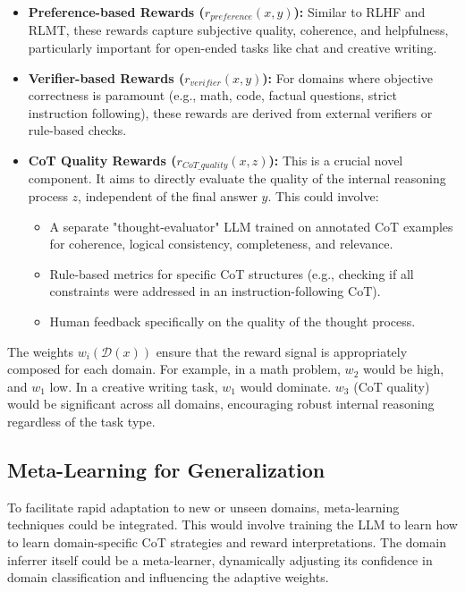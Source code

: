 \documentclass{article}
\begin{document}
\begin{itemize}
    \item \textbf{Preference-based Rewards ($r_{preference}(x, y)$):} Similar to RLHF and RLMT, these rewards capture subjective quality, coherence, and helpfulness, particularly important for open-ended tasks like chat and creative writing.
    \item \textbf{Verifier-based Rewards ($r_{verifier}(x, y)$):} For domains where objective correctness is paramount (e.g., math, code, factual questions, strict instruction following), these rewards are derived from external verifiers or rule-based checks.
    \item \textbf{CoT Quality Rewards ($r_{CoT\_quality}(x, z)$):} This is a crucial novel component. It aims to directly evaluate the quality of the internal reasoning process $z$, independent of the final answer $y$. This could involve:
    \begin{itemize}
        \item A separate "thought-evaluator" LLM trained on annotated CoT examples for coherence, logical consistency, completeness, and relevance.
        \item Rule-based metrics for specific CoT structures (e.g., checking if all constraints were addressed in an instruction-following CoT).
        \item Human feedback specifically on the quality of the thought process.
    \end{itemize}
\end{itemize}
The weights $w_i(\mathcal{D}(x))$ ensure that the reward signal is appropriately composed for each domain. For example, in a math problem, $w_2$ would be high, and $w_1$ low. In a creative writing task, $w_1$ would dominate. $w_3$ (CoT quality) would be significant across all domains, encouraging robust internal reasoning regardless of the task type.

\subsection{Meta-Learning for Generalization}
To facilitate rapid adaptation to new or unseen domains, meta-learning techniques could be integrated. This would involve training the LLM to learn how to learn domain-specific CoT strategies and reward interpretations. The domain inferrer itself could be a meta-learner, dynamically adjusting its confidence in domain classification and influencing the adaptive weights.
\end{document}
